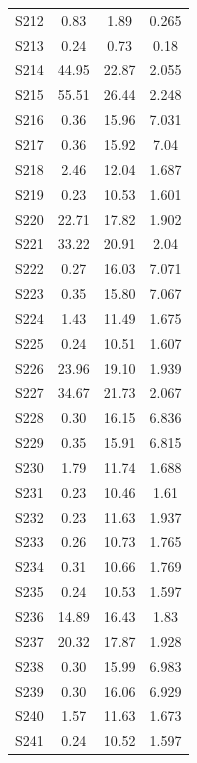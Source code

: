 {\begin{longtable}{l S[table-format=7.2] S[table-format=7.2] S[table-format=7.3]}
S212 & 0.83 & 1.89 & 0.265 \\
S213 & 0.24 & 0.73 & 0.18 \\
S214 & 44.95 & 22.87 & 2.055 \\
S215 & 55.51 & 26.44 & 2.248 \\
S216 & 0.36 & 15.96 & 7.031 \\
S217 & 0.36 & 15.92 & 7.04 \\
S218 & 2.46 & 12.04 & 1.687 \\
S219 & 0.23 & 10.53 & 1.601 \\
S220 & 22.71 & 17.82 & 1.902 \\
S221 & 33.22 & 20.91 & 2.04 \\
S222 & 0.27 & 16.03 & 7.071 \\
S223 & 0.35 & 15.80 & 7.067 \\
S224 & 1.43 & 11.49 & 1.675 \\
S225 & 0.24 & 10.51 & 1.607 \\
S226 & 23.96 & 19.10 & 1.939 \\
S227 & 34.67 & 21.73 & 2.067 \\
S228 & 0.30 & 16.15 & 6.836 \\
S229 & 0.35 & 15.91 & 6.815 \\
S230 & 1.79 & 11.74 & 1.688 \\
S231 & 0.23 & 10.46 & 1.61 \\
S232 & 0.23 & 11.63 & 1.937 \\
S233 & 0.26 & 10.73 & 1.765 \\
S234 & 0.31 & 10.66 & 1.769 \\
S235 & 0.24 & 10.53 & 1.597 \\
S236 & 14.89 & 16.43 & 1.83 \\
S237 & 20.32 & 17.87 & 1.928 \\
S238 & 0.30 & 15.99 & 6.983 \\
S239 & 0.30 & 16.06 & 6.929 \\
S240 & 1.57 & 11.63 & 1.673 \\
S241 & 0.24 & 10.52 & 1.597 \\
\end{longtable}
}